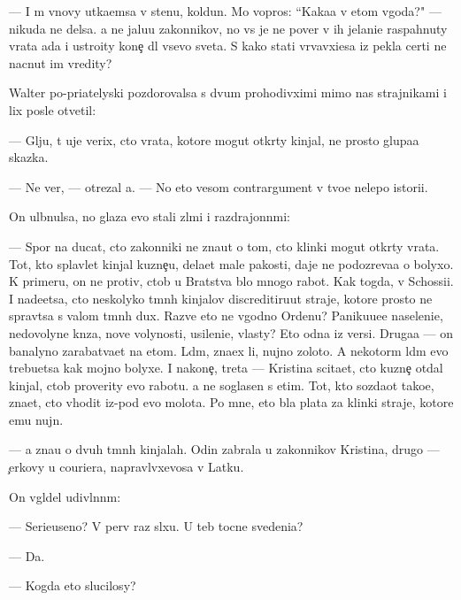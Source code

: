 \documentclass[10pt]{book}
\begin{document}
— I m{\yi} vnovy ut{\yi}ka{\y}emsa v stenu, koldun. Mo{\y} vopros: ``Kaka{\y}a v etom v{\yi}goda?" — nikuda ne delsa. {\Y}a ne jalu{\y}u zakonnikov, no vs{\e} je ne pover{\io} v ih jelani{\y}e raspahnuty vrata ada i ustro{\y}ity kone{\c} dl{\ia} vsevo sveta. S kako{\y} stati v{\yi}rvavxi{\y}esa iz pekla certi ne nacnut im vredity?

Walter po-pri{\y}atelyski pozdorovalsa s dvum{\ia} prohodivximi mimo nas strajnikami i lix posle otvetil:

— Gl{\ia}ju, t{\yi} uje verix, cto vrata, kotor{\yi}{\y}e mogut otkr{\yi}ty kinjal{\yi}, ne prosto glupa{\y}a skazka.

— Ne ver{\io}, — otrezal {\y}a. — No eto vesom{\yi}{\y} contrargument v tvo{\y}e{\y} nelepo{\y} istori{\y}i.

On ul{\yi}bnulsa, no glaza {\y}evo stali zl{\yi}mi i razdrajonn{\yi}mi:

— Spor{\io} na ducat, cto zakonniki ne zna{\y}ut o tom, cto klinki mogut otkr{\yi}ty vrata. Tot, kto splavl{\ia}{\y}et kinjal{\yi} kuzne{\c}u, dela{\y}et mal{\yi}{\y}e pakosti, daje ne podozreva{\y}a o bolyxo{\y}. K primeru, on ne protiv, ctob{\yi} u Bratstva b{\yi}lo mnogo rabot{\yi}. Kak togda, v Schossi{\y}i. I nade{\y}etsa, cto neskolyko t{\e}mn{\yi}h kinjalov discreditiru{\y}ut straje{\y}, kotor{\yi}{\y}e prosto ne sprav{\ia}tsa s valom t{\e}mn{\yi}h dux. Razve eto ne v{\yi}godno Ordenu? Paniku{\y}u{\x}e{\y}e naseleni{\y}e, nedovolyn{\yi}{\y}e kn{\ia}z{\y}a, nov{\yi}{\y}e volynosti, usileni{\y}e, vlasty? Eto odna iz versi{\y}. Druga{\y}a — on banalyno zarabat{\yi}va{\y}et na etom. L{\io}d{\ia}m, zna{\y}ex li, nujno zoloto. A nekotor{\yi}m l{\io}d{\ia}m {\y}evo trebu{\y}etsa kak mojno bolyxe. I nakone{\c}, tret{\y}a — Kristina scita{\y}et, cto kuzne{\c} otdal kinjal, ctob{\yi} proverity {\y}evo rabotu. {\Y}a ne soglasen s etim. Tot, kto sozda{\y}ot tako{\y}e, zna{\y}et, cto v{\yi}hodit iz-pod {\y}evo molota. Po mne, eto b{\yi}la plata za klinki straje{\y}, kotor{\yi}{\y}e {\y}emu nujn{\yi}.

— {\Y}a zna{\y}u o dvuh t{\e}mn{\yi}h kinjalah. Odin zabrala u zakonnikov Kristina, drugo{\y} — {\c}erkovy u couriera, napravl{\ia}vxevosa v Latku.

On v{\yi}gl{\ia}del udivl{\e}nn{\yi}m:

— Serieuseno? V perv{\yi}{\y} raz sl{\yi}xu. U teb{\ia} tocn{\yi}{\y}e svedeni{\y}a?

— Da.

— Kogda eto slucilosy?
\end{document}
